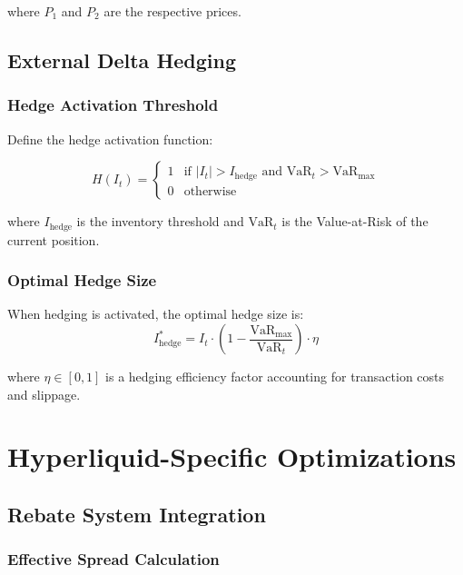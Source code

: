 \documentclass[11pt,a4paper]{article}
\theoremstyle{definition}
\begin{document}
where $P_1$ and $P_2$ are the respective prices.

\subsection{External Delta Hedging}

\subsubsection{Hedge Activation Threshold}

Define the hedge activation function:

\begin{equation}
H(I_t) = \begin{cases}
1 & \text{if } |I_t| > I_{\text{hedge}} \text{ and } \text{VaR}_t > \text{VaR}_{\max} \\
0 & \text{otherwise}
\end{cases}
\end{equation}

where $I_{\text{hedge}}$ is the inventory threshold and $\text{VaR}_t$ is the Value-at-Risk of the current position.

\subsubsection{Optimal Hedge Size}

When hedging is activated, the optimal hedge size is:
\begin{equation}
I_{\text{hedge}}^* = I_t \cdot \left(1 - \frac{\text{VaR}_{\max}}{\text{VaR}_t}\right) \cdot \eta
\end{equation}

where $\eta \in [0,1]$ is a hedging efficiency factor accounting for transaction costs and slippage.

\section{Hyperliquid-Specific Optimizations}

\subsection{Rebate System Integration}

\subsubsection{Effective Spread Calculation}
\end{document}

